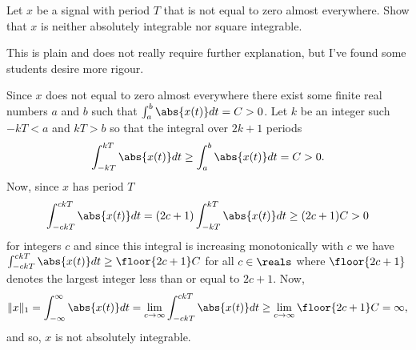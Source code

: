 \begin{excersizelist}
\item \label{exer:periodnotabsint} Let $x$ be a signal with period $T$ that is not equal to zero almost everywhere.  Show that $x$ is neither absolutely integrable nor square integrable.
\begin{solution}
This is plain and does not really require further explanation, but I've found some students desire more rigour.  

Since $x$ does not equal to zero almost everywhere there exist some finite real numbers $a$ and $b$  such that $\int_{a}^b \abs{x(t)}dt = C > 0$.  Let $k$ be an integer such $-kT < a$ and $kT > b$ so that the integral over $2k+1$ periods 
\[
\int_{-kT}^{kT}\abs{x(t)}dt \geq \int_{a}^b \abs{x(t)}dt = C > 0.
\] 
Now, since $x$ has period $T$
\[
\int_{-ckT}^{ckT}\abs{x(t)}dt = (2c+1) \int_{-kT}^{kT}\abs{x(t)}dt \geq (2c+1)C > 0
\] 
for integers $c$ and since this integral is increasing monotonically with $c$ we have $\int_{-ckT}^{ckT}\abs{x(t)}dt \geq \floor{2c+1}C$ for all $c \in \reals$ where $\floor{2c+1}$ denotes the largest integer less than or equal to $2c+1$.  Now,
\[
\|x\|_1 = \int_{-\infty}^{\infty} \abs{x(t)} dt = \lim_{c \to \infty} \int_{-ckT}^{ckT}\abs{x(t)}dt \geq \lim_{c \to \infty} \floor{2c+1}C = \infty,
\]
and so, $x$ is not absolutely integrable.

\end{solution}

\end{excersizelist}



